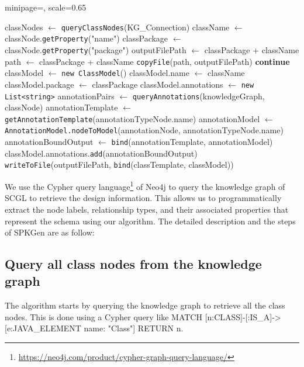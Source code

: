 \documentclass[runningheads]{llncs}
\begin{document}
\begin{algorithm}
\caption{SPKGen Algorithm}
\begin{adjustbox}{minipage=\textwidth, scale=0.65}
\begin{algorithmic}[1]
    \State classNodes $\gets$ \texttt{queryClassNodes}(KG\_Connection)
        \State className $\gets$ classNode.\texttt{getProperty}("name")
        \State classPackage $\gets$ classNode.\texttt{getProperty}("package")
        \State outputFilePath $\gets$ classPackage + className
        \State path $\gets$ classPackage + className
            \State \texttt{copyFile}(path, outputFilePath)
        \Else
            \State \textbf{continue}
        \EndIf
        \State classModel $\gets$ \texttt{new ClassModel}()
        \State classModel.name $\gets$ className
        \State classModel.package $\gets$ classPackage
        \State classModel.annotations $\gets$ \texttt{new List<string>}
        \State annotationPairs $\gets$ \texttt{queryAnnotations}(knowledgeGraph, classNode)
            \State annotationTemplate $\gets$ \texttt{getAnnotationTemplate}(annotationTypeNode.name)
            \State annotationModel $\gets$ \texttt{AnnotationModel.nodeToModel}(annotationNode, annotationTypeNode.name)
            \State annotationBoundOutput $\gets$ \texttt{bind}(annotationTemplate, annotationModel)
            \State classModel.annotations.\texttt{add}(annotationBoundOutput)
            \State \texttt{writeToFile}(outputFilePath, \texttt{bind}(classTemplate, classModel))
        \EndFor
    \EndFor
\EndFunction
\end{algorithmic}
\end{adjustbox}
\end{algorithm}

We use the Cypher query language\footnote{\url{https://neo4j.com/product/cypher-graph-query-language/}} of Neo4j to query the knowledge graph of SCGL to retrieve the design information. This allows us to programmatically extract the node labels, relationship types, and their associated properties that represent the schema using our algorithm. The detailed description and the steps of SPKGen are as follow:

\subsection{Query all class nodes from the knowledge graph}
The algorithm starts by querying the knowledge graph to retrieve all the class nodes. This is done using a Cypher query like MATCH [n:CLASS]-[:IS\_A]->[e:JAVA\_ELEMENT {name: "Class"}] RETURN n.
\end{document}
